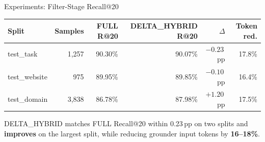 \begin{frame}{Experiments: Filter-Stage Recall@20}
  \begin{center}
    \scriptsize
    \begin{tabular}{l r r r r r}
      \toprule
      \textbf{Split} & \textbf{Samples} & \textbf{FULL R@20} & \textbf{DELTA\_HYBRID R@20} & \textbf{$\Delta$} & \textbf{Token red.} \\
      \midrule
      test\_task    & 1,257 & 90.30\% & 90.07\% & $-0.23$\,pp & 17.8\% \\
      test\_website & 975   & 89.95\% & 89.85\% & $-0.10$\,pp & 16.4\% \\
      test\_domain  & 3,838 & 86.78\% & 87.98\% & $+1.20$\,pp & 17.5\% \\
      \bottomrule
    \end{tabular}
  \end{center}

  \vskip0.5cm
  DELTA\_HYBRID matches FULL Recall@20 within 0.23\,pp on two splits and \textbf{improves} on the largest split, while reducing grounder input tokens by \textbf{16--18\%}.
\end{frame}
